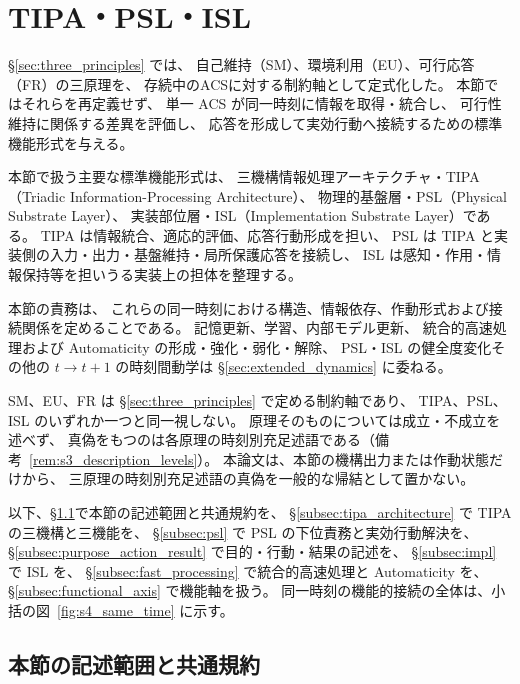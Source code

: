 \section{TIPA・PSL・ISL}
\label{sec:tipa}

\S\ref{sec:three_principles} では、
自己維持（SM）、環境利用（EU）、可行応答（FR）の三原理を、
存続中のACSに対する制約軸として定式化した。
本節ではそれらを再定義せず、
単一 ACS が同一時刻に情報を取得・統合し、
可行性維持に関係する差異を評価し、
応答を形成して実効行動へ接続するための標準機能形式を与える。

本節で扱う主要な標準機能形式は、
三機構情報処理アーキテクチャ・TIPA（Triadic Information-Processing Architecture）、
物理的基盤層・PSL（Physical Substrate Layer）、
実装部位層・ISL（Implementation Substrate Layer）である。
TIPA は情報統合、適応的評価、応答行動形成を担い、
PSL は TIPA と実装側の入力・出力・基盤維持・局所保護応答を接続し、
ISL は感知・作用・情報保持等を担いうる実装上の担体を整理する。

本節の責務は、
これらの同一時刻における構造、情報依存、作動形式および接続関係を定めることである。
記憶更新、学習、内部モデル更新、
統合的高速処理および Automaticity の形成・強化・弱化・解除、
PSL・ISL の健全度変化その他の
$t\to t+1$ の時刻間動学は
\S\ref{sec:extended_dynamics} に委ねる。

\begin{remark}[原理水準と機構記述の関係]
\label{rem:principle_level_locus}
SM、EU、FR は \S\ref{sec:three_principles} で定める制約軸であり、
TIPA、PSL、ISL のいずれか一つと同一視しない。
原理そのものについては成立・不成立を述べず、
真偽をもつのは各原理の時刻別充足述語である（備考~\ref{rem:s3_description_levels}）。
本論文は、本節の機構出力または作動状態だけから、
三原理の時刻別充足述語の真偽を一般的な帰結として置かない。
\end{remark}

以下、\S\ref{subsec:s4_scope}で本節の記述範囲と共通規約を、
\S\ref{subsec:tipa_architecture} で TIPA の三機構と三機能を、
\S\ref{subsec:psl} で PSL の下位責務と実効行動解決を、
\S\ref{subsec:purpose_action_result} で目的・行動・結果の記述を、
\S\ref{subsec:impl} で ISL を、
\S\ref{subsec:fast_processing} で統合的高速処理と Automaticity を、
\S\ref{subsec:functional_axis} で機能軸を扱う。
同一時刻の機能的接続の全体は、小括の図~\ref{fig:s4_same_time} に示す。

\subsection{本節の記述範囲と共通規約}
\label{subsec:s4_scope}

